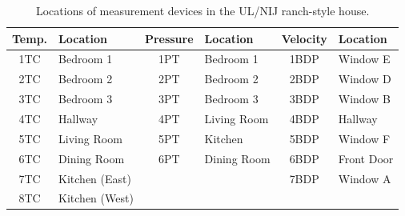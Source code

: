 \begin{table}[ht!]
\begin{center}
\begin{tabular}{|c|l||c|l||c|l|}
\hline
Temp.              & Location          & Pressure             & Location       & Velocity              & Location    \\ \hline \hline
1TC              & Bedroom 1       & 1PT                & Bedroom 1    & 1BDP                & Window E    \\ \hline
2TC              & Bedroom 2       & 2PT                & Bedroom 2    & 2BDP                & Window D    \\ \hline
3TC              & Bedroom 3       & 3PT                & Bedroom 3    & 3BDP                & Window B    \\ \hline
4TC              & Hallway          & 4PT                & Living Room    & 4BDP                & Hallway    \\ \hline
5TC              & Living Room       & 5PT                & Kitchen       & 5BDP                & Window F    \\ \hline
6TC              & Dining Room       & 6PT                & Dining Room    & 6BDP                & Front Door\\ \hline
7TC              & Kitchen (East)    & \multicolumn{2}{r||}{}            & 7BDP                & Window A    \\ \cline{1-2} \cline{5-6}
8TC              & Kitchen (West)    & \multicolumn{2}{r}{}               & \multicolumn{2}{r|}{}           \\ \hline
\end{tabular}
\end{center}
\caption[Locations of measurement devices in the UL/NIJ ranch-style house]
{Locations of measurement devices in the UL/NIJ ranch-style house.}
\label{Ranch_devices}
\end{table}

